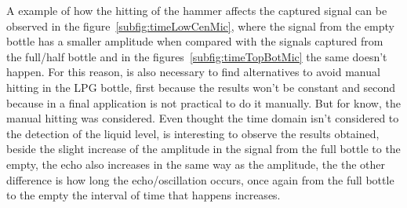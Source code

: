 A example of how the hitting of the hammer affects the captured signal can be observed in the figure~\ref{subfig:timeLowCenMic}, where the signal from the empty bottle has a smaller amplitude when compared with the signals captured from the full/half bottle and in the figures~\ref{subfig:timeTopBotMic} the same doesn't happen. For this reason, is also necessary to find alternatives to avoid manual hitting in the LPG bottle, first because the results won't be constant and second because in a final application is not practical to do it manually. But for know, the manual hitting was considered.
Even thought the time domain isn't considered to the detection of the liquid level, is interesting to observe the results obtained, beside the slight increase of the amplitude in the signal from the full bottle to the empty, the echo also increases in the same way as the amplitude, the the other difference is how long the echo/oscillation occurs, once again from the full bottle to the empty the interval of time that happens increases. 

